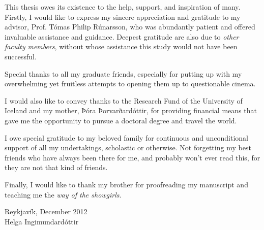 This thesis owes its existence to the help, support, and inspiration of many. 
Firstly, I would like to express my sincere appreciation and gratitude to my 
advisor, Prof. Tómas Philip Rúnarsson, who was abundantly patient and offered 
invaluable assistance and guidance. Deepest gratitude are also due to 
\emph{other faculty members}, without whose assistance this study would not 
have been successful.

Special thanks to all my graduate friends, especially for putting up with my overwhelming yet fruitless attempts to opening them up to questionable cinema. 

I would also like to convey thanks to the Research Fund of the University of Iceland and my mother, Þóra Þorvarðardóttir, for providing financial means that gave me the opportunity to pursue a doctoral degree and travel the world. %

I owe special gratitude to my beloved family for continuous and unconditional support of all my undertakings, scholastic or otherwise. Not forgetting my best friends who have always been there for me, and probably won't ever read this, for they are not that kind of friends. 

Finally, I would like to thank my brother for proofreading my manuscript and teaching me the \emph{way of the showgirls}.

\begin{flushright}
	\vfill
	Reykjavík, December 2012 \\ 
	Helga Ingimundardóttir
\end{flushright}
